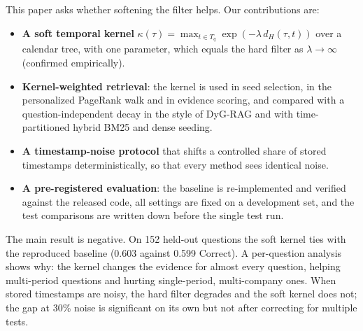 This paper asks whether softening the filter helps. Our contributions are:
\begin{itemize}
  \item \textbf{A soft temporal kernel} $\kappa(\tau) = \max_{t \in T_q} \exp(-\lambda\, d_H(\tau, t))$ over a calendar tree, with one parameter, which equals the hard filter as $\lambda \to \infty$ (confirmed empirically).
  \item \textbf{Kernel-weighted retrieval}: the kernel is used in seed selection, in the personalized PageRank walk and in evidence scoring, and compared with a question-independent decay in the style of DyG-RAG \cite{sun2025dygrag} and with time-partitioned hybrid BM25 and dense seeding.
  \item \textbf{A timestamp-noise protocol} that shifts a controlled share of stored timestamps deterministically, so that every method sees identical noise.
  \item \textbf{A pre-registered evaluation}: the baseline is re-implemented and verified against the released code, all settings are fixed on a development set, and the test comparisons are written down before the single test run.
\end{itemize}
The main result is negative. On 152 held-out questions the soft kernel ties with the reproduced baseline (0.603 against 0.599 Correct). A per-question analysis shows why: the kernel changes the evidence for almost every question, helping multi-period questions and hurting single-period, multi-company ones. When stored timestamps are noisy, the hard filter degrades and the soft kernel does not; the gap at 30\% noise is significant on its own but not after correcting for multiple tests.
